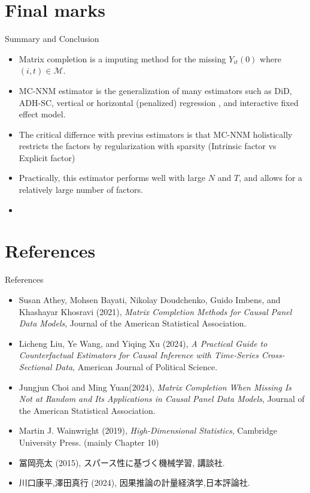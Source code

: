 \documentclass[xcolor=svgnames,aspectratio=169]{beamer}
\begin{document}
\section{Final marks}

\begin{frame}{Summary and Conclusion}
    \begin{itemize}
        \item Matrix completion is a imputing method for the missing $Y_{it}(0)$ where $(i,t)\in \mathcal{M}$.
        \item MC-NNM estimator is the generalization of many estimators such as DiD, ADH-SC, vertical or horizontal (penalized) regression , and interactive fixed effect model.
        \item The critical differnce with previus estimators is that MC-NNM \alert{holistically restricts} the factors by regularization with sparsity (Intrinsic factor vs Explicit factor)
        \item Practically, this estimator performs well with large $N$ and $T$, and allows for a relatively large number of factors.
        \item 
    \end{itemize}
\end{frame}

\section{References}

\begin{frame}{References}
    \begin{itemize}
        \item Susan Athey, Mohsen Bayati, Nikolay Doudchenko, Guido Imbens, and Khashayar Khosravi (2021), \textit{Matrix Completion Methods for Causal Panel Data Models}, Journal of the American Statistical Association.
        \item Licheng Liu, Ye Wang, and Yiqing Xu (2024), \textit{A Practical Guide to Counterfactual Estimators for Causal Inference with Time-Series Cross-Sectional Data},  American Journal of Political Science.
        \item Jungjun Choi and Ming Yuan(2024), \textit{Matrix Completion When Missing Is Not at Random and Its Applications in Causal Panel Data Models}, Journal of the American Statistical Association.
        \item Martin J. Wainwright (2019), \textit{High-Dimensional Statistics}, Cambridge University Press. (mainly Chapter 10)
        \item 冨岡亮太 (2015), スパース性に基づく機械学習, 講談社.
        \item 川口康平,澤田真行 (2024), 因果推論の計量経済学,日本評論社.
    \end{itemize}
\end{frame}
\end{document}
